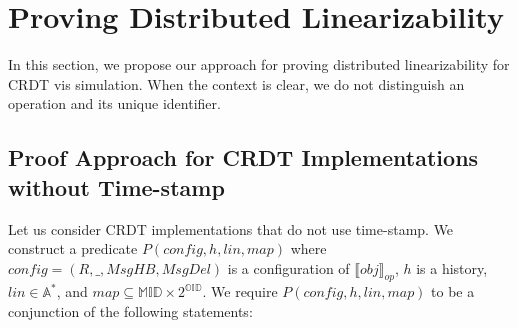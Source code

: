 
\section{Proving Distributed Linearizability}
\label{sec:proving distributed linearizability}

In this section, we propose our approach for proving distributed linearizability for CRDT vis simulation. When the context is clear, we do not distinguish an operation and its unique identifier.


\subsection{Proof Approach for CRDT Implementations without Time-stamp}
\label{subsec:proof approach for CRDT implementations without time-stamp}

Let us consider CRDT implementations that do not use time-stamp. We construct a predicate $P(\mathit{config},h,\mathit{lin},\mathit{map})$ where $\mathit{config} = (R,\_,\mathit{MsgHB},\mathit{MsgDel})$ is a configuration of $\llbracket \mathit{obj} \rrbracket_{\mathit{op}}$, $h$ is a history, $\mathit{lin} \in \mathbb{A}^*$, and $\mathit{map} \subseteq \mathbb{MID} \times 2^{\mathbb{OID}}$. We require $P(\mathit{config},h,\mathit{lin},\mathit{map})$ to be a conjunction of the following statements:

